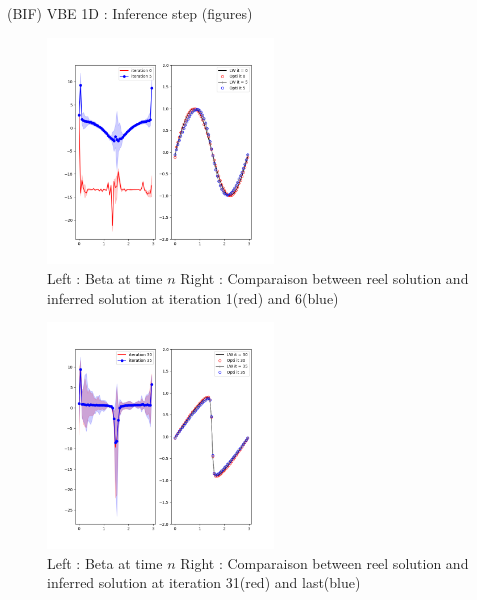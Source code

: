 \documentclass[10pt,
			   xcolor=svgnames,
			   hyperref={linkcolor=red, citecolor = DarkGreen, colorlinks=true, urlcolor=Navy}]{beamer}
\begin{document}
\begin{frame}{(BIF) VBE 1D : Inference step (figures)}
\vspace{-1cm}
\begin{multicols}{2}
\noindent
	\begin{figure}[H]
		\centering
		\includegraphics[width = 6cm, height= 6cm]{nu0_0250_CFL0_40_Nx_52_InferenceVSTrue_it5.png}
		\vspace{-0.5cm}	
		\caption{Left : Beta at time $n$ Right : Comparaison between reel solution and inferred solution at iteration 1(red) and 6(blue)}
	\end{figure}

\columnbreak

	\begin{figure}[H]
		\centering
		\includegraphics[width = 6cm, height=6cm]{nu0_0250_CFL0_40_Nx_52_InferenceVSTrue_it35.png}
		\vspace{-0.5cm}	
		\caption{Left : Beta at time $n$ Right : Comparaison between reel solution and inferred solution at iteration 31(red) and last(blue)}
	\end{figure}

\end{multicols}

\end{frame}
\end{document}
